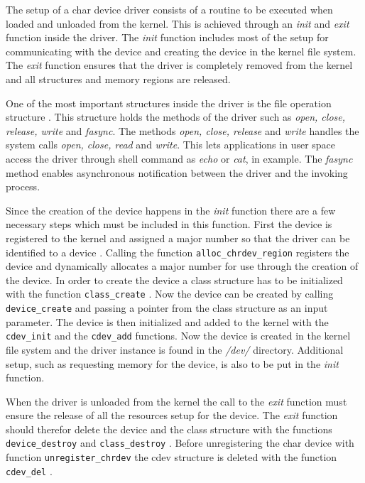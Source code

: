 
The setup of a char device driver consists of a routine to be executed when loaded and unloaded from the kernel. This is achieved through an \emph{init} and \emph{exit} function \cite{initexit} inside the driver. The \emph{init} function includes most of the setup for communicating with the device and creating the device in the kernel file system. The \emph{exit} function ensures that the driver is completely removed from the kernel and all structures and memory regions are released. 

One of the most important structures inside the driver is the file operation structure \cite{fops}. This structure holds the methods of the driver such as \emph{open, close, release, write} and \emph{fasync}. The methods \emph{open, close, release} and \emph{write} handles the system calls \emph{open, close, read} and \emph{write}. This lets applications in user space access the driver through shell command as \emph{echo} or \emph{cat}, in example. The \emph{fasync} \cite{fasync} method enables asynchronous notification between the driver and the invoking process. 

Since the creation of the device happens in the \emph{init} function there are a few necessary steps which must be included in this function. First the device is registered to the kernel and assigned a major number so that the driver can be identified to a device \cite{major}. Calling the function \texttt{alloc\_chrdev\_region} \cite{region} registers the device and dynamically allocates a major number for use through the creation of the device. In order to create the device a class structure has to be initialized with the function \texttt{class\_create} \cite{class}. Now the device can be created by calling \texttt{device\_create} \cite{devcreate} and passing a pointer from the class structure as an input parameter. The device is then initialized and added to the kernel with the \texttt{cdev\_init} \cite{cinit} and the \texttt{cdev\_add} \cite{cadd} functions. Now the device is created in the kernel file system and the driver instance is found in the \emph{/dev/} directory. Additional setup, such as requesting memory for the device, is also to be put in the \emph{init} function.

When the driver is unloaded from the kernel the call to the \emph{exit} function must ensure the release of all the resources setup for the device. The \emph{exit} function should therefor delete the device and the class structure with the functions \texttt{device\_destroy} \cite{devdestroy} and \texttt{class\_destroy} \cite{classdestroy}. Before unregistering the char device with function \texttt{unregister\_chrdev} \cite{unregister} the cdev structure is deleted with the function \texttt{cdev\_del} \cite{cdel}.

